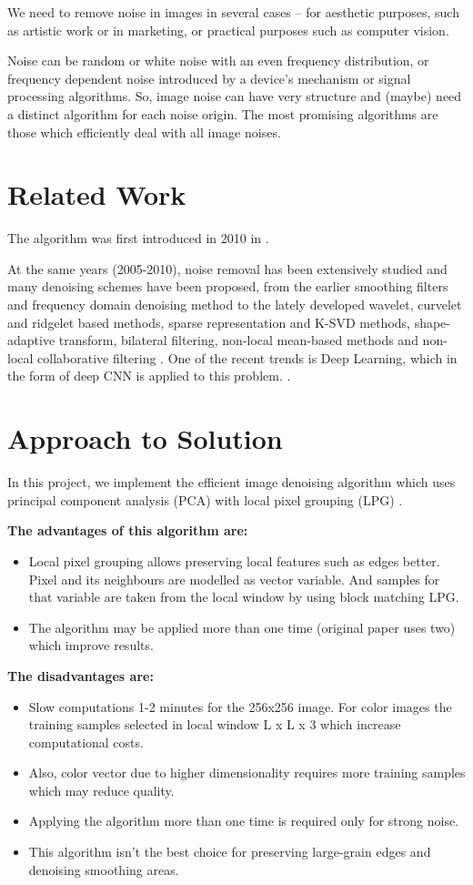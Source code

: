 We need to remove noise in images in several cases – for aesthetic purposes, such as artistic work or in marketing, or practical purposes such as computer vision.  

Noise can be random or white noise with an even frequency distribution, or frequency dependent noise introduced by a device's mechanism or signal processing algorithms. So, image noise can have very structure and (maybe) need a distinct algorithm for each noise origin. The most promising algorithms are those which efficiently deal with all image noises.

\section{Related Work}
The algorithm was first introduced in 2010 in \cite{zhang2010two}.  

At the same years (2005-2010), noise removal has been extensively studied and many denoising schemes have been proposed, from the earlier smoothing filters and frequency domain denoising method to the lately developed wavelet, curvelet and ridgelet based methods, sparse representation and K-SVD methods, shape-adaptive transform, bilateral filtering, non-local mean-based methods and non-local collaborative filtering \cite{zhang2010two}. One of the recent trends is Deep Learning, which in the form of deep CNN is applied to this problem. \cite{zhang2017beyond}. 

\section{Approach to Solution}
In this project, we implement the efficient image denoising algorithm which uses principal component analysis (PCA) with local pixel grouping (LPG) \cite{zhang2010two}. 

\textbf{The advantages of this algorithm are:}
\begin{itemize}
    \item Local pixel grouping allows preserving local features such as edges better. Pixel and its neighbours are modelled as vector variable. And samples for that variable are taken from the local window by using block matching LPG. 
    \item The algorithm may be applied more than one time (original paper uses two) which improve results. 
\end{itemize}

\textbf{The disadvantages are:}
\begin{itemize}
    \item Slow computations 1-2 minutes for the 256x256 image. For color images the training samples selected in local window L x L x 3 which increase computational costs.
    \item Also, color vector due to higher dimensionality requires more training samples which may reduce quality. 
    \item Applying the algorithm more than one time is required only for strong noise. 
    \item This algorithm isn’t the best choice for preserving large-grain edges and denoising smoothing areas. 
\end{itemize}

